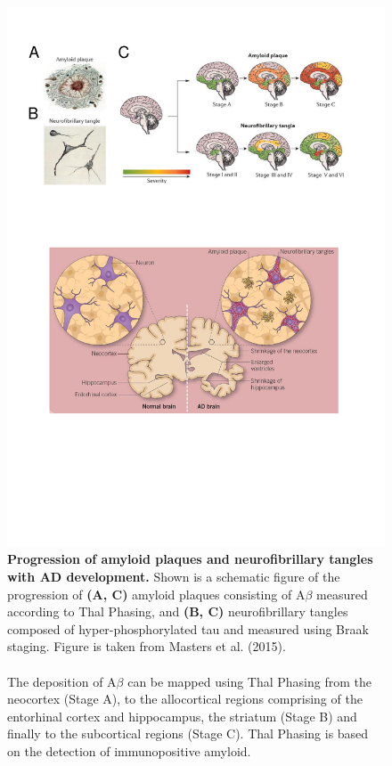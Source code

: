 \begin{figure}[!htp]
	\centering
	\includegraphics[page=1,trim={0 19cm 0cm 0cm},clip, scale = 0.8]{Figures/Introduction_Figures.pdf}
	\captionsetup{width=0.95\textwidth,singlelinecheck=off}
	\caption[Progression of amyloid plaques and neurofibrillary tangles with AD development]%
	{\textbf{Progression of amyloid plaques and neurofibrillary tangles with AD development.} Shown is a schematic figure of the progression of \textbf{(A, C)} amyloid plaques consisting of A$\beta$ measured according to Thal Phasing\cite{DR2002}, and \textbf{(B, C)} neurofibrillary tangles composed of hyper-phosphorylated tau and measured using Braak staging\cite{H1991}. Figure is taken from Masters et al. (2015)\cite{Masters2015}. 
	\\
	\\ 
	The deposition of A$\beta$ can be mapped using Thal Phasing from the neocortex (Stage A), to the allocortical regions comprising of the entorhinal cortex and hippocampus, the striatum (Stage B) and finally to the subcortical regions (Stage C)\cite{DR2002}. Thal Phasing is based on the detection of immunopositive amyloid.
}
\end{figure}
